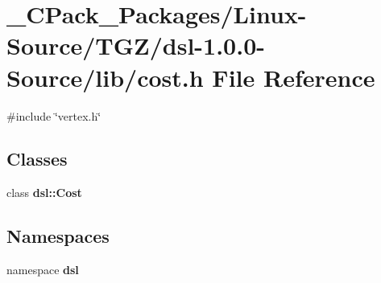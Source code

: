 \section{\_\-CPack\_\-Packages/Linux-\/Source/TGZ/dsl-\/1.0.0-\/Source/lib/cost.h File Reference}
\label{__CPack__Packages_2Linux-Source_2TGZ_2dsl-1_80_80-Source_2lib_2cost_8h}
{\ttfamily \#include \char`\"{}vertex.h\char`\"{}}\par
\subsection*{Classes}
\begin{DoxyCompactItemize}
\item 
class {\bf dsl::Cost}
\end{DoxyCompactItemize}
\subsection*{Namespaces}
\begin{DoxyCompactItemize}
\item 
namespace {\bf dsl}
\end{DoxyCompactItemize}
